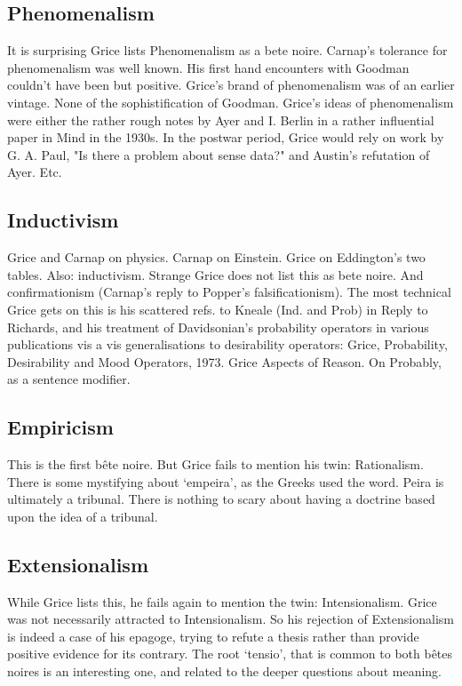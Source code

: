 \documentclass[10pt,titlepage]{book}
\begin{document}
{\subsection{Phenomenalism}

It is surprising Grice lists Phenomenalism as a bete 
noire. Carnap's tolerance  for phenomenalism was well known. His first hand 
encounters with Goodman  couldn't have been but positive. Grice's brand of 
phenomenalism was of an  earlier vintage. None of the sophistification of 
Goodman. Grice's ideas of  phenomenalism were either the rather rough notes by Ayer 
and I. Berlin in a  rather influential paper in Mind in the 1930s. In the 
postwar period, Grice  would rely on work by G. A. Paul, "Is there a problem 
about sense data?" and  Austin's refutation of Ayer. Etc. 

\subsection{Inductivism}

Grice and Carnap on physics. Carnap on Einstein. Grice on 
Eddington's two  tables. Also: 
inductivism.  Strange Grice does not list this as bete noire. And 
confirmationism (Carnap's  reply to Popper's falsificationism). The most technical 
Grice gets on this is  his scattered refs. to Kneale (Ind. and Prob) in Reply 
to Richards, and his  treatment of Davidsonian's probability operators in 
various publications vis a  vis generalisations to desirability operators:  
Grice, Probability, Desirability and Mood  Operators, 1973. Grice Aspects of 
Reason. On Probably, as a sentence modifier.

\subsection{Empiricism}

This is the first bête noire. But Grice fails to mention his 
twin: Rationalism.  There is some mystifying about ‘empeira’, as the Greeks 
used the word. Peira is  ultimately a tribunal. There is nothing to scary 
about having a doctrine based  upon the idea of a tribunal.  

\subsection{Extensionalism}

While Grice lists this, he fails again to mention the 
twin: Intensionalism.  Grice was not necessarily attracted to Intensionalism. So 
his rejection of  Extensionalism is indeed a case of his epagoge, trying to 
refute a thesis rather  than provide positive evidence for its contrary. 
The root ‘tensio’, that is  common to both bêtes noires is an interesting 
one, and related to the deeper  questions about meaning. 


}
\end{document}
